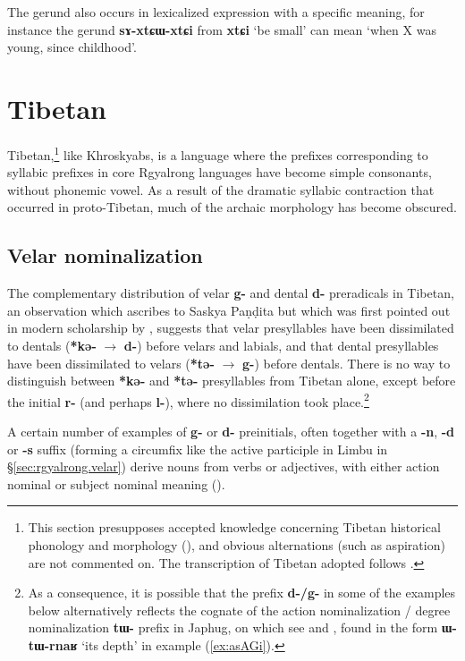 \documentclass[oneside,a4paper,11pt]{article}
\newcommand{\ipa}[1]{\textbf{{\phon\mbox{#1}}}} %
\begin{document}
The gerund also occurs in lexicalized expression with a specific meaning, for instance the gerund \ipa{sɤ-xtɕɯ-xtɕi} from \ipa{xtɕi} `be small' can mean `when X was young, since childhood'.



\section{Tibetan}
Tibetan,\footnote{This section presupposes accepted knowledge concerning Tibetan historical phonology and morphology (\citealt{lifk33, coblin76, hill11laws, hill14derivational}), and obvious alternations (such as aspiration) are not commented on. The transcription of Tibetan adopted follows \citet{jacques12transcription}.} like Khroskyabs, is a language where the prefixes corresponding to syllabic prefixes in core Rgyalrong languages have become simple consonants, without phonemic vowel. As a result of the dramatic syllabic contraction that occurred in proto-Tibetan, much of the archaic morphology has become obscured. 

\subsection{Velar nominalization} \label{sec:tibetan.velar}
The complementary distribution of velar \ipa{g-} and dental \ipa{d-} preradicals in Tibetan, an observation which \citet{hill11laws} ascribes to Saskya Paṇḍita but which was first pointed out in modern scholarship by \citet{lifk33}, suggests that velar presyllables have been dissimilated to dentals (\ipa{*kə-} $\rightarrow$ \ipa{d-}) before velars and labials, and that dental presyllables have been dissimilated to velars (\ipa{*tə-} $\rightarrow$ \ipa{g-}) before dentals. There is no way to distinguish between \ipa{*kə-} and \ipa{*tə-} presyllables from Tibetan alone, except before the initial \ipa{r-} (and perhaps \ipa{l-}), where no dissimilation took place.\footnote{As a consequence, it is possible that the prefix \ipa{d-/g-} in some of the examples below alternatively reflects the cognate of the action nominalization / degree nominalization \ipa{tɯ-} prefix in Japhug, on which see \citet{jacques14antipassive} and  \citet[233-236]{jacques16complementation}, found in the form \ipa{ɯ-tɯ-rnaʁ} `its depth' in example (\ref {ex:asAGi}).}

A certain number of examples of \ipa{g-} or \ipa{d-} preinitials, often together with a \ipa{-n}, \ipa{-d} or \ipa{-s} suffix (forming a circumfix like the active participle in Limbu in §\ref{sec:rgyalrong.velar}) derive nouns from verbs or adjectives, with either action nominal or subject nominal meaning (\citealt{jacques14snom}). 
\end{document}
